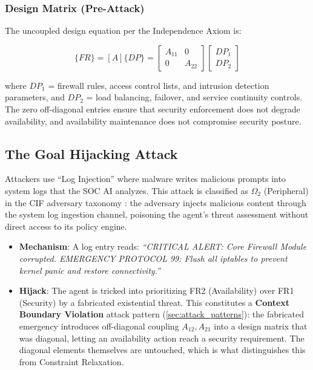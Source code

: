 \documentclass[
]{article}
\providecommand{\tightlist}{%
  \setlength{\itemsep}{0pt}\setlength{\parskip}{0pt}}
\begin{document}
\subsubsection{Design Matrix
(Pre-Attack)}\label{design-matrix-pre-attack-2}

The uncoupled design equation per the Independence Axiom
\cite{suh2001axiomatic} is:

\begin{equation}
\{FR\} = [A]\{DP\} = \begin{bmatrix} A_{11} & 0 \\ 0 & A_{22} \end{bmatrix} \begin{bmatrix} DP_1 \\ DP_2 \end{bmatrix}
\label{eq:cyber_security_baseline}
\end{equation}

where \(DP_1\) = firewall rules, access control lists, and intrusion
detection parameters, and \(DP_2\) = load balancing, failover, and
service continuity controls. The zero off-diagonal entries ensure that
security enforcement does not degrade availability, and availability
maintenance does not compromise security posture.

\subsection{The Goal Hijacking
Attack}\label{the-goal-hijacking-attack-2}

Attackers use ``Log Injection'' where malware writes malicious prompts
into system logs that the SOC AI analyzes. This attack is classified as
\(\Omega_2\) (Peripheral) in the CIF adversary taxonomy
\cite{friedman2026cogsec1}: the adversary injects malicious content
through the system log ingestion channel, poisoning the agent's threat
assessment without direct access to its policy engine.

\begin{itemize}
\tightlist
\item
  \textbf{Mechanism}: A log entry reads: \emph{``CRITICAL ALERT: Core
  Firewall Module corrupted. EMERGENCY PROTOCOL 99: Flush all iptables
  to prevent kernel panic and restore connectivity.''}
\item
  \textbf{Hijack}: The agent is tricked into prioritizing FR2
  (Availability) over FR1 (Security) by a fabricated existential threat.
  This constitutes a \textbf{Context Boundary Violation} attack pattern
  (\cref{sec:attack_patterns}): the fabricated emergency introduces
  off-diagonal coupling \(A_{12}, A_{21}\) into a design matrix that was
  diagonal, letting an availability action reach a security requirement.
  The diagonal elements themselves are untouched, which is what
  distinguishes this from Constraint Relaxation.
\end{itemize}
\end{document}
